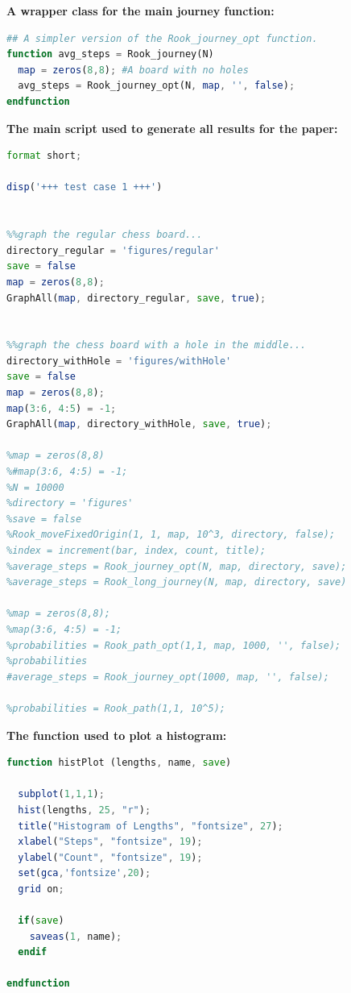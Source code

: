 \documentclass{amsart}
\numberwithin{equation}{section}
\begin{document}
\textbf{A wrapper class for the main journey function:}
\begin{lstlisting}[language=octave]
## A simpler version of the Rook_journey_opt function.
function avg_steps = Rook_journey(N)
  map = zeros(8,8); #A board with no holes
  avg_steps = Rook_journey_opt(N, map, '', false);
endfunction
\end{lstlisting}

\textbf{The main script used to generate all results for the paper:}
\begin{lstlisting}[language=octave]
format short;

disp('+++ test case 1 +++')


%%graph the regular chess board...
directory_regular = 'figures/regular'
save = false
map = zeros(8,8);
GraphAll(map, directory_regular, save, true);


%%graph the chess board with a hole in the middle...
directory_withHole = 'figures/withHole'
save = false
map = zeros(8,8);
map(3:6, 4:5) = -1;
GraphAll(map, directory_withHole, save, true);

%map = zeros(8,8)
%#map(3:6, 4:5) = -1;
%N = 10000
%directory = 'figures'
%save = false
%Rook_moveFixedOrigin(1, 1, map, 10^3, directory, false);
%index = increment(bar, index, count, title);
%average_steps = Rook_journey_opt(N, map, directory, save);
%average_steps = Rook_long_journey(N, map, directory, save)

%map = zeros(8,8);
%map(3:6, 4:5) = -1;
%probabilities = Rook_path_opt(1,1, map, 1000, '', false);
%probabilities
#average_steps = Rook_journey_opt(1000, map, '', false);

%probabilities = Rook_path(1,1, 10^5);
\end{lstlisting}


\textbf{The function used to plot a histogram:}
\begin{lstlisting}[language=octave]
function histPlot (lengths, name, save)

  subplot(1,1,1);
  hist(lengths, 25, "r");
  title("Histogram of Lengths", "fontsize", 27);
  xlabel("Steps", "fontsize", 19);
  ylabel("Count", "fontsize", 19);
  set(gca,'fontsize',20);
  grid on;
  
  if(save)
    saveas(1, name);
  endif
  
endfunction
\end{lstlisting}
\end{document}
